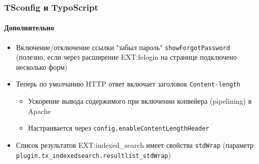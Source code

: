 %
%

\begin{frame}[fragile]
	\frametitle{TSconfig и TypoScript}
	\framesubtitle{Дополнительно}

	\begin{itemize}

		\item Включение/отключение ссылки "забыл пароль"
		\small\texttt{showForgotPassword}\normalsize\newline
			(полезно, если через расширение EXT:felogin на странице подключено несколько форм)

		\item Теперь по умолчанию HTTP ответ включает заголовок \texttt{Content-length}

			\begin{itemize}
				\item Ускорение вывода содержимого при включении конвейера (pipelining) в Apache
				\item Настраивается через \texttt{config.enableContentLengthHeader}
			\end{itemize}

		\item Список результатов EXT:indexed\_search имеет свойства \texttt{stdWrap}\newline
			(параметр: \texttt{plugin.tx\_indexedsearch.resultlist\_stdWrap})

	\end{itemize}

\end{frame}


